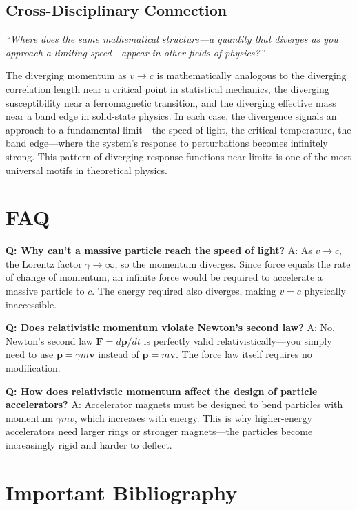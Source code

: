 \documentclass[11pt,openright]{book}
\begin{document}
\subsection*{Cross-Disciplinary Connection}
\textit{``Where does the same mathematical structure---a quantity that diverges as you approach a limiting speed---appear in other fields of physics?''}

The diverging momentum as $v \to c$ is mathematically analogous to the diverging correlation length near a critical point in statistical mechanics, the diverging susceptibility near a ferromagnetic transition, and the diverging effective mass near a band edge in solid-state physics. In each case, the divergence signals an approach to a fundamental limit---the speed of light, the critical temperature, the band edge---where the system's response to perturbations becomes infinitely strong. This pattern of diverging response functions near limits is one of the most universal motifs in theoretical physics.

\section*{FAQ}

\textbf{Q: Why can't a massive particle reach the speed of light?}
A: As $v \to c$, the Lorentz factor $\gamma \to \infty$, so the momentum diverges. Since force equals the rate of change of momentum, an infinite force would be required to accelerate a massive particle to $c$. The energy required also diverges, making $v = c$ physically inaccessible.

\textbf{Q: Does relativistic momentum violate Newton's second law?}
A: No. Newton's second law $\mathbf{F} = d\mathbf{p}/dt$ is perfectly valid relativistically---you simply need to use $\mathbf{p} = \gamma m \mathbf{v}$ instead of $\mathbf{p} = m\mathbf{v}$. The force law itself requires no modification.

\textbf{Q: How does relativistic momentum affect the design of particle accelerators?}
A: Accelerator magnets must be designed to bend particles with momentum $\gamma m v$, which increases with energy. This is why higher-energy accelerators need larger rings or stronger magnets---the particles become increasingly rigid and harder to deflect.
\section*{Important Bibliography}
\end{document}
